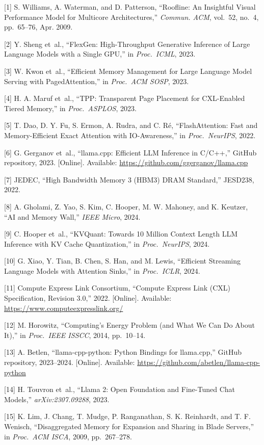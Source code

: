 \documentclass[conference]{IEEEtran}
\begin{document}
[1] S. Williams, A. Waterman, and D. Patterson, ``Roofline: An Insightful Visual Performance Model for Multicore Architectures,'' \emph{Commun. ACM}, vol.~52, no.~4, pp.~65--76, Apr. 2009.

[2] Y. Sheng et~al., ``FlexGen: High-Throughput Generative Inference of Large Language Models with a Single GPU,'' in \emph{Proc.\ ICML}, 2023.

[3] W. Kwon et~al., ``Efficient Memory Management for Large Language Model Serving with PagedAttention,'' in \emph{Proc.\ ACM SOSP}, 2023.

[4] H. A. Maruf et~al., ``TPP: Transparent Page Placement for CXL-Enabled Tiered Memory,'' in \emph{Proc.\ ASPLOS}, 2023.

[5] T. Dao, D. Y. Fu, S. Ermon, A. Rudra, and C. R\'e, ``FlashAttention: Fast and Memory-Efficient Exact Attention with IO-Awareness,'' in \emph{Proc.\ NeurIPS}, 2022.

[6] G. Gerganov et~al., ``llama.cpp: Efficient LLM Inference in C/C++,'' GitHub repository, 2023. [Online]. Available: \url{https://github.com/ggerganov/llama.cpp}

[7] JEDEC, ``High Bandwidth Memory 3 (HBM3) DRAM Standard,'' JESD238, 2022.

[8] A. Gholami, Z. Yao, S. Kim, C. Hooper, M. W. Mahoney, and K. Keutzer, ``AI and Memory Wall,'' \emph{IEEE Micro}, 2024.

[9] C. Hooper et~al., ``KVQuant: Towards 10 Million Context Length LLM Inference with KV Cache Quantization,'' in \emph{Proc.\ NeurIPS}, 2024.

[10] G. Xiao, Y. Tian, B. Chen, S. Han, and M. Lewis, ``Efficient Streaming Language Models with Attention Sinks,'' in \emph{Proc.\ ICLR}, 2024.

[11] Compute Express Link Consortium, ``Compute Express Link (CXL) Specification, Revision 3.0,'' 2022. [Online]. Available: \url{https://www.computeexpresslink.org/}

[12] M. Horowitz, ``Computing's Energy Problem (and What We Can Do About It),'' in \emph{Proc.\ IEEE ISSCC}, 2014, pp.~10--14.

[13] A. Betlen, ``llama-cpp-python: Python Bindings for llama.cpp,'' GitHub repository, 2023--2024. [Online]. Available: \url{https://github.com/abetlen/llama-cpp-python}

[14] H. Touvron et~al., ``Llama 2: Open Foundation and Fine-Tuned Chat Models,'' \emph{arXiv:2307.09288}, 2023.

[15] K. Lim, J. Chang, T. Mudge, P. Ranganathan, S. K. Reinhardt, and T. F. Wenisch, ``Disaggregated Memory for Expansion and Sharing in Blade Servers,'' in \emph{Proc.\ ACM ISCA}, 2009, pp.~267--278.
\end{document}
